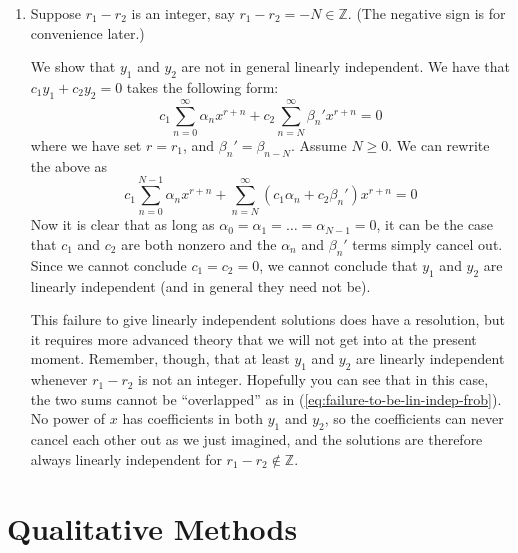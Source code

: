 \documentclass[11pt, letterpaper, oneside]{article}     %
\numberwithin{equation}{subsection}
\theoremstyle{definition}
\numberwithin{theorem}{section}
\theoremstyle{remark}
\newcommand{\ZZ}{\mathbb{Z}}
\begin{document}
\begin{enumerate}
  This is what we had. And it works when $F(r)$ has two distinct roots. But what if it only has one root? This is a problem we will extend our method to solve in the future. Before we do that, we will elaborate on the other special case where the above fails; when $r_1 - r_2$ is an integer.

  \medskip

\item Suppose $r_1-r_2$ is an integer, say $r_1 - r_2 = -N \in \ZZ$. (The negative sign is for convenience later.)

  We show that $y_1$ and $y_2$ are not in general linearly independent. We have that $c_1y_1 + c_2y_2 = 0$ takes the following form:
  \begin{equation}
    c_1\sum_{n=0}^\infty \alpha_n x^{r+n} + c_2 \sum_{n=N}^\infty\beta_n'x^{r+n} = 0
  \end{equation}
  where we have set $r = r_1$, and $\beta_n' = \beta_{n - N}$. Assume $N \geq 0$. We can rewrite the above as
  \begin{equation}\label{eq:failure-to-be-lin-indep-frob}
    c_1\sum_{n=0}^{N-1}\alpha_nx^{r+n} + \sum_{n=N}^\infty (c_1\alpha_n + c_2\beta_n')x^{r+n} = 0
  \end{equation}
  Now it is clear that as long as $\alpha_0 = \alpha_1 = \dots = \alpha_{N-1} = 0$, it can be the case that $c_1$ and $c_2$ are both nonzero and the $\alpha_n$ and $\beta_n'$ terms simply cancel out. Since we cannot conclude $c_1 = c_2 = 0$, we cannot conclude that $y_1$ and $y_2$ are linearly independent (and in general they need not be).

  This failure to give linearly independent solutions does have a resolution, but it requires more advanced theory that we will not get into at the present moment. Remember, though, that at least $y_1$ and $y_2$ are linearly independent whenever $r_1 - r_2$ is not an integer. Hopefully you can see that in this case, the two sums cannot be ``overlapped'' as in (\ref{eq:failure-to-be-lin-indep-frob}). No power of $x$ has coefficients in both $y_1$ and $y_2$, so the coefficients can never cancel each other out as we just imagined, and the solutions are therefore always linearly independent for $r_1 - r_2 \notin \ZZ$.

\end{enumerate}

\section{Qualitative Methods}
\end{document}
